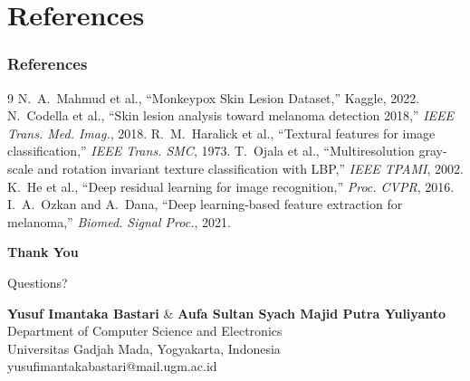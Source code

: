 \documentclass[aspectratio=169,professionalfonts]{beamer}
\begin{document}
\section*{References}

\begin{frame}
    \frametitle{References}
    \scriptsize
    \begin{thebibliography}{9}
        \setlength{\itemsep}{1pt}
         N.~A.~Mahmud et al., ``Monkeypox Skin Lesion Dataset,'' Kaggle, 2022.
         N.~Codella et al., ``Skin lesion analysis toward melanoma detection 2018,'' \textit{IEEE Trans. Med. Imag.}, 2018.
         R.~M.~Haralick et al., ``Textural features for image classification,'' \textit{IEEE Trans. SMC}, 1973.
         T.~Ojala et al., ``Multiresolution gray-scale and rotation invariant texture classification with LBP,'' \textit{IEEE TPAMI}, 2002.
         K.~He et al., ``Deep residual learning for image recognition,'' \textit{Proc. CVPR}, 2016.
         I.~A.~Ozkan and A.~Dana, ``Deep learning-based feature extraction for melanoma,'' \textit{Biomed. Signal Proc.}, 2021.
    \end{thebibliography}
\end{frame}

\begin{frame}[plain]
    \vspace{3cm}
    \begin{center}
        \Huge\textbf{Thank You}
        \vspace{1cm}
        
        \Large Questions?
        \vspace{1.5cm}
        
        \normalsize
        \textbf{Yusuf Imantaka Bastari} \& \textbf{Aufa Sultan Syach Majid Putra Yuliyanto}\\
        Department of Computer Science and Electronics\\
        Universitas Gadjah Mada, Yogyakarta, Indonesia\\
        yusufimantakabastari@mail.ugm.ac.id
    \end{center}
\end{frame}
\end{document}

